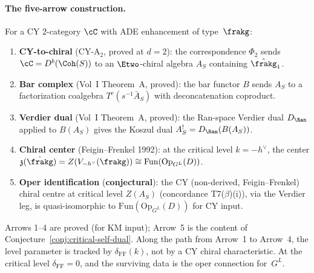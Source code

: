 \paragraph{The five-arrow construction.}
For a CY $2$-category $\cC$ with ADE enhancement of type~$\frakg$:
\begin{enumerate}[label=\textbf{Arrow~\arabic*.}, leftmargin=*]
 \item \textbf{CY-to-chiral} (CY-A$_2$, proved at $d = 2$): the correspondence $\Phi_2$ sends $\cC = D^b(\Coh(S))$ to an $\Etwo$-chiral algebra $A_S$ containing $\hat{\frakg}_1$.
 \item \textbf{Bar complex} (Vol~I Theorem~A, proved): the bar functor $B$ sends $A_S$ to a factorization coalgebra $T^c(s^{-1}\bar{A}_S)$ with deconcatenation coproduct.
 \item \textbf{Verdier dual} (Vol~I Theorem~A, proved): the Ran-space Verdier dual $D_{\Ran}$ applied to $B(A_S)$ gives the Koszul dual $A_S^! = D_{\Ran}(B(A_S))$.
 \item \textbf{Chiral center} (Feigin--Frenkel 1992): at the critical level $k = -h^\vee$, the center $\mathfrak{z}(\hat{\frakg}) = Z(V_{-h^\vee}(\frakg)) \cong \mathrm{Fun}(\mathrm{Op}_{G^L}(D))$.
 \item \textbf{Oper identification} (\textbf{conjectural}): the CY (non-derived, Feigin--Frenkel) chiral centre at critical level $Z(A_S)$ (concordance T7($\beta$)(i)), via the Verdier leg, is quasi-isomorphic to $\mathrm{Fun}(\mathrm{Op}_{G^L}(D))$ for CY input.
\end{enumerate}
Arrows 1--4 are proved (for KM input); Arrow~5 is the content of Conjecture~\ref{conj:critical-self-dual}. Along the path from Arrow~1 to Arrow~4, the level parameter is tracked by $\delta_{\mathrm{FF}}(k)$, not by a CY chiral characteristic. At the critical level $\delta_{\mathrm{FF}}=0$, and the surviving data is the oper connection for~$G^L$.

